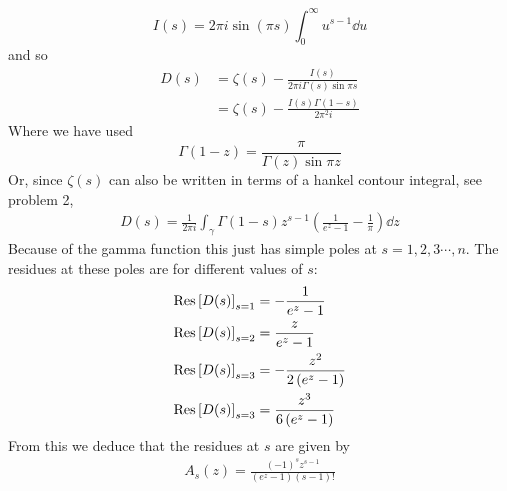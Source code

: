 \documentclass[a4paper,12pt]{article}
\begin{document}
\begin{equation}
I(s)=2\pi i\sin(\pi s)\int_{0}^{\infty}u^{s-1}	\dd u
\end{equation}
and so
\begin{equation}
	\begin{aligned}
		D(s)
		&=\zeta(s)-\frac{I(s)}{2\pi i \Gamma(s)\sin \pi s}
		\\
		&=\zeta(s)-\frac{I(s)\Gamma(1-s)}{2\pi^2 i }
	\end{aligned}
\end{equation}
Where we have used
\begin{equation}
	\Gamma(1-z)=\frac{\pi}{\Gamma(z)\sin \pi z}
\end{equation}
Or, since $\zeta(s)$ can also be written in terms of a hankel contour integral, see problem 2, 
\begin{equation}
	\begin{aligned}
D(s)=\frac{1}{2\pi i}\int_\gamma
\Gamma(1-s) z^{s-1}\left(\frac{1}{e^{z}-1}-\frac{1}{\pi}\right) \dd z
	\end{aligned}
\end{equation}
Because of the gamma function this just has simple poles at $s=1,2,3\cdots,n$. The residues at these poles are for different values of $s$:
\begin{equation}
	\begin{aligned}
		\Res \left[D(s)\right]_{s=1}&=-\frac{1}{e^z-1}\\
		\Res \left[D(s)\right]_{s=2}&=\frac{z}{e^z-1}\\
		\Res \left[D(s)\right]_{s=3}&=-\frac{z^2}{2 \left(e^z-1\right)}\\
		\Res \left[D(s)\right]_{s=3}&=\frac{z^3}{6 \left(e^z-1\right)}
	\end{aligned}
\end{equation}
From this we deduce that the residues at $s$ are given by
\begin{equation}
	\begin{aligned}
		A_s(z)=\frac{(-1)^s z^{s-1}}{\left(e^z-1\right) (s-1)!}
	\end{aligned}
\end{equation}
\end{document}

